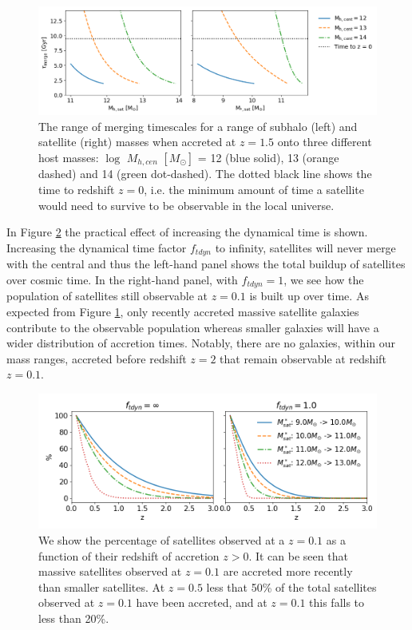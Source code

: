 \begin{figure}[h]
    \centering
    \includegraphics[width = \linewidth]{Figures/Chapter3/Tdyn_M.png}
    \caption{The range of merging timescales for a range of subhalo (left) and satellite (right) masses when accreted at $z = 1.5$ onto three different host masses: $\log$ $M_{h, cen}$ $[M_{\odot}]$ = 12 (blue solid), 13 (orange dashed) and 14 (green dot-dashed). The dotted black line shows the time to redshift $z = 0$, i.e. the minimum amount of time a satellite would need to survive to be observable in the local universe.}
    \label{fig:Tdyn_M}
\end{figure}

In Figure \ref{fig:AccretionTime} the practical effect of increasing the dynamical time is shown. Increasing the dynamical time factor $f_{tdyn}$ to infinity, satellites will never merge with the central and thus the left-hand panel shows the total buildup of satellites over cosmic time. In the right-hand panel, with $f_{tdyn} = 1$, we see how the population of satellites still observable at $z=0.1$ is built up over time. As expected from Figure \ref{fig:Tdyn_M}, only recently accreted massive satellite galaxies contribute to the observable population whereas smaller galaxies will have a wider distribution of accretion times. Notably, there are no galaxies, within our mass ranges, accreted before redshift $z=2$ that remain observable at redshift $z=0.1$.

\begin{figure}[h]
    \centering
    \includegraphics[width = \linewidth]{Figures/Chapter3/AccretedSatellitePercentage.png}
    \caption{We show the percentage of satellites observed at a $z = 0.1$ as a function of their redshift of accretion $z > 0$. It can be seen that massive satellites observed at $z = 0.1$ are accreted more recently than smaller satellites. At $z = 0.5$ less that 50\% of the total satellites observed at $z = 0.1$ have been accreted, and at $z = 0.1$ this falls to less than 20\%. }
    \label{fig:AccretionTime}
\end{figure}

